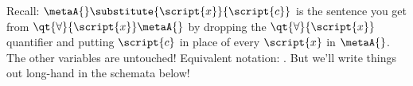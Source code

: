 
Recall: $\metaA{}\substitute{\script{x}}{\script{c}}$ is the sentence you get from $\qt{\forall}{\script{x}}\metaA{}$ by dropping the $\qt{\forall}{\script{x}}$ quantifier and putting $\script{c}$ in place of every $\script{x}$ in $\metaA{}$. The other variables are untouched! Equivalent notation: \metaA{}\hspace{.15em}. But we'll write things out long-hand in the schemata below! 




